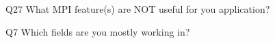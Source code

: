 \begin{description}%
\item{Q27} What MPI feature(s) are NOT useful for you application?%
\item{Q7} Which fields are you mostly working in?%
\end{description}%

